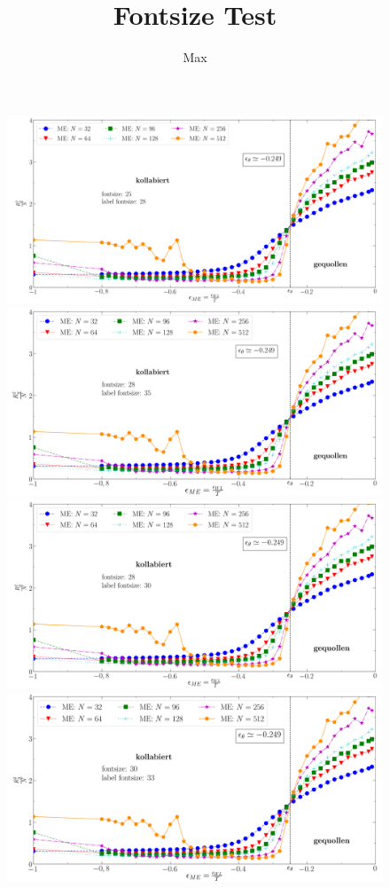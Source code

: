 \documentclass{article}
\begin{document}
\title{Fontsize Test}
\author{Max}
\maketitle
\begin{figure}
\includegraphics[width=\textwidth]{png_25_28.png}

\includegraphics[width=\textwidth]{png_28_28.png}

\includegraphics[width=\textwidth]{png_28_30.png}

\includegraphics[width=\textwidth]{png_30_30.png}
\end{figure}
\end{document}
